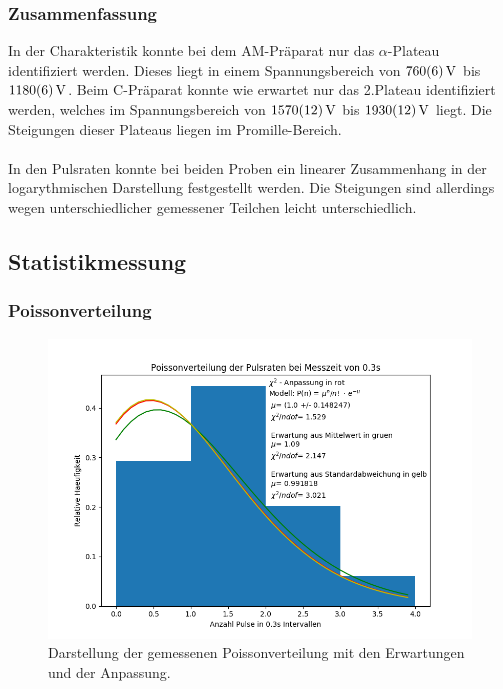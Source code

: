 \documentclass[12pt,a4paper]{article}
\begin{document}
\subsubsection{Zusammenfassung}
In der Charakteristik konnte bei dem AM-Präparat nur das $\alpha$-Plateau identifiziert werden. Dieses liegt in einem Spannungsbereich von $\SI{760\pm 6}{V}$ bis $\SI{1180\pm 6}{V}$. Beim C-Präparat konnte wie erwartet nur das 2.Plateau identifiziert werden, welches im Spannungsbereich von $\SI{1570\pm 12}{V}$ bis $\SI{1930\pm 12}{V}$ liegt. Die Steigungen dieser Plateaus liegen im Promille-Bereich.\\
\\
In den Pulsraten konnte bei beiden Proben ein linearer Zusammenhang in der logarythmischen Darstellung festgestellt werden. Die Steigungen sind allerdings wegen unterschiedlicher gemessener Teilchen leicht unterschiedlich.
\newpage


\subsection{Statistikmessung}

\subsubsection{Poissonverteilung}
\begin{figure}
\centering
\includegraphics[scale=0.8]{Bilder/poisson.PNG}
\caption{Darstellung der gemessenen Poissonverteilung mit den Erwartungen und der Anpassung.}
\label{fig:Poisson}
\end{figure}
\end{document}
